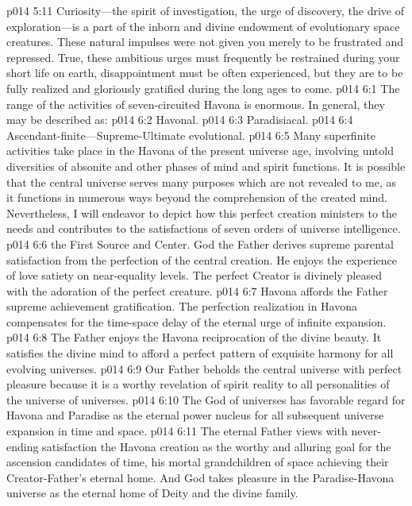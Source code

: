 \vs p014 5:11 Curiosity---the spirit of investigation, the urge of discovery, the drive of exploration---is a part of the inborn and divine endowment of evolutionary space creatures. These natural impulses were not given you merely to be frustrated and repressed. True, these ambitious urges must frequently be restrained during your short life on earth, disappointment must be often experienced, but they are to be fully realized and gloriously gratified during the long ages to come.\plusone
{}
\vs p014 6:1 The range of the activities of seven\hyp{}circuited Havona is enormous. In general, they may be described as:
\pc \vs p014 6:2 \bibnobreakspace Havonal.
\vs p014 6:3 \bibnobreakspace Paradisiacal.
\vs p014 6:4 \bibnobreakspace Ascendant\hyp{}finite---Supreme\hyp{}Ultimate evolutional.
\pc \vs p014 6:5 Many superfinite activities take place in the Havona of the present universe age, involving untold diversities of absonite and other phases of mind and spirit functions. It is possible that the central universe serves many purposes which are not revealed to me, as it functions in numerous ways beyond the comprehension of the created mind. Nevertheless, I will endeavor to depict how this perfect creation ministers to the needs and contributes to the satisfactions of seven orders of universe intelligence.
\pc \vs p014 6:6 \bibnobreakspace {}the First Source and Center. God the Father derives supreme parental satisfaction from the perfection of the central creation. He enjoys the experience of love satiety on near\hyp{}equality levels. The perfect Creator is divinely pleased with the adoration of the perfect creature.
\vs p014 6:7 Havona affords the Father supreme achievement gratification. The perfection realization in Havona compensates for the time\hyp{}space delay of the eternal urge of infinite expansion.
\vs p014 6:8 The Father enjoys the Havona reciprocation of the divine beauty. It satisfies the divine mind to afford a perfect pattern of exquisite harmony for all evolving universes.\plusone
\vs p014 6:9 Our Father beholds the central universe with perfect pleasure because it is a worthy revelation of spirit reality to all personalities of the universe of universes.
\vs p014 6:10 The God of universes has favorable regard for Havona and Paradise as the eternal power nucleus for all subsequent universe expansion in time and space.
\vs p014 6:11 The eternal Father views with never\hyp{}ending satisfaction the Havona creation as the worthy and alluring goal for the ascension candidates of time, his mortal grandchildren of space achieving their Creator\hyp{}Father’s eternal home. And God takes pleasure in the Paradise\hyp{}Havona universe as the eternal home of Deity and the divine family.
